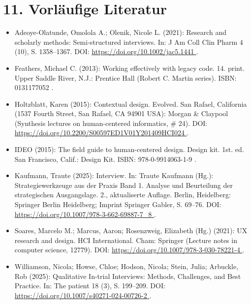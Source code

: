 \section*{11. Vorläufige Literatur}
\begin{itemize}
    \item Adeoye‐Olatunde, Omolola A.; Olenik, Nicole L. (2021): Research and scholarly methods: Semi‐structured interviews. In: J Am Coll Clin Pharm 4 (10), S. 1358–1367. DOI: \url{https://doi.org/10.1002/jac5.1441 }.
    
    \item Feathers, Michael C. (2013): Working effectively with legacy code. 14. print. Upper Saddle River, N.J.: Prentice Hall (Robert C. Martin series). ISBN: 0131177052 .
    
    \item Holtzblatt, Karen (2015): Contextual design. Evolved. San Rafael, California (1537 Fourth Street, San Rafael, CA 94901 USA): Morgan \& Claypool (Synthesis lectures on human-centered informatics, \# 24). DOI: \url{https://doi.org/10.2200/S00597ED1V01Y201409HCI024  }.
    
    \item IDEO (2015): The field guide to human-centered design. Design kit. 1st. ed. San Francisco, Calif.: Design Kit. ISBN: 978-0-9914063-1-9 .
    
    \item Kaufmann, Traute (2025): Interview. In: Traute Kaufmann (Hg.): Strategiewerkzeuge aus der Praxis Band 1. Analyse und Beurteilung der strategischen Ausgangslage. 2., aktualiserte Auflage. Berlin, Heidelberg: Springer Berlin Heidelberg; Imprint Springer Gabler, S. 69–76. DOI: \url{https://doi.org/10.1007/978-3-662-69887-7_8  }.
    
    \item Soares, Marcelo M.; Marcus, Aaron; Rosenzweig, Elizabeth (Hg.) (2021): UX research and design. HCI International. Cham: Springer (Lecture notes in computer science, 12779). DOI: \url{https://doi.org/10.1007/978-3-030-78221-4  }.

    \item Williamson, Nicola; Howse, Chloe; Hodson, Nicola; Stein, Julia; Arbuckle, Rob (2025): Qualitative In-trial Interviews: Methods, Challenges, and Best Practice. In: The patient 18 (3), S. 199–209. DOI: \url{https://doi.org/10.1007/s40271-024-00726-2  }.
\end{itemize}
